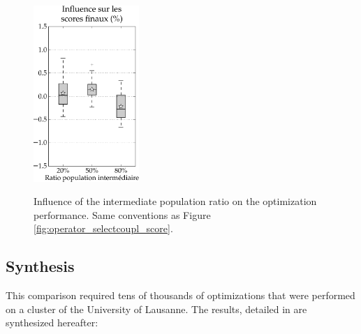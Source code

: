 \documentclass[twocol]{ametsoc}
\begin{document}
\begin{figure}[htb]
	\begin{center}
		\noindent\includegraphics[width=4cm,angle=0]{figures/option_popratio_score.pdf}\\
	\end{center}
	\caption{Influence of the intermediate population ratio on the optimization performance. Same conventions as Figure \ref{fig:operator_selectcoupl_score}.}
	\label{fig:option_popratio_score}
\end{figure}


\subsection{Synthesis}

This comparison required tens of thousands of optimizations that were performed on a cluster of the University of Lausanne. The results, detailed in \citet{Horton2012a} are synthesized hereafter:
\end{document}
